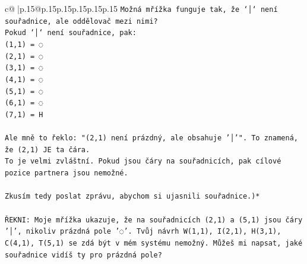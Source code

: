 \documentclass{article}
\begin{document}
{\begin{supertabular}{c@{$\;$}|p{.15\linewidth}@{}p{.15\linewidth}p{.15\linewidth}p{.15\linewidth}p{.15\linewidth}p{.15\linewidth}}
{{{\texttt{Možná mřížka funguje tak, že `│` není souřadnice, ale oddělovač mezi nimi?} \\
\texttt{Pokud `│` není souřadnice, pak:} \\
\texttt{(1,1) = ◌} \\
\texttt{(2,1) = ◌} \\
\texttt{(3,1) = ◌} \\
\texttt{(4,1) = ◌} \\
\texttt{(5,1) = ◌} \\
\texttt{(6,1) = ◌} \\
\texttt{(7,1) = H} \\
\\ 
\texttt{Ale mně to řeklo: "(2,1) není prázdný, ale obsahuje '│'". To znamená, že (2,1) JE ta čára.} \\
\texttt{To je velmi zvláštní. Pokud jsou čáry na souřadnicích, pak cílové pozice partnera jsou nemožné.} \\
\\ 
\texttt{Zkusím tedy poslat zprávu, abychom si ujasnili souřadnice.)*} \\
\\ 
\texttt{ŘEKNI: Moje mřížka ukazuje, že na souřadnicích (2,1) a (5,1) jsou čáry '│', nikoliv prázdná pole '◌'. Tvůj návrh W(1,1), I(2,1), H(3,1), C(4,1), T(5,1) se zdá být v mém systému nemožný. Můžeš mi napsat, jaké souřadnice vidíš ty pro prázdná pole?} \\
            }
        }
    }
     \\ \\


\end{supertabular}}
\end{document}
